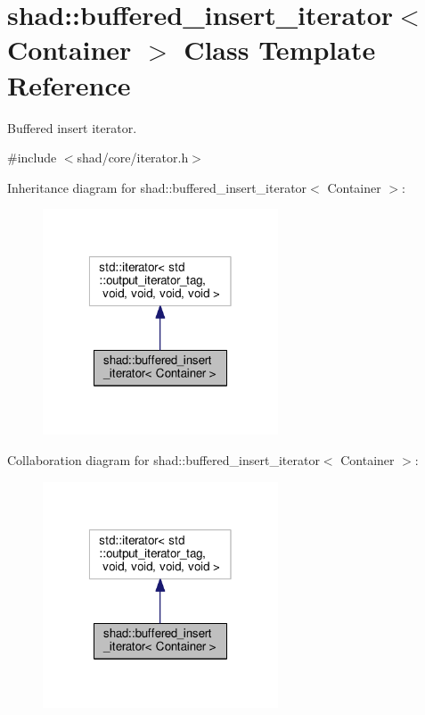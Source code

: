 \hypertarget{classshad_1_1buffered__insert__iterator}{\section{shad\-:\-:buffered\-\_\-insert\-\_\-iterator$<$ Container $>$ Class Template Reference}
\label{classshad_1_1buffered__insert__iterator}
}


Buffered insert iterator.  




{\ttfamily \#include $<$shad/core/iterator.\-h$>$}



Inheritance diagram for shad\-:\-:buffered\-\_\-insert\-\_\-iterator$<$ Container $>$\-:
\nopagebreak
\begin{figure}[H]
\begin{center}
\leavevmode
\includegraphics[width=198pt]{classshad_1_1buffered__insert__iterator__inherit__graph}
\end{center}
\end{figure}


Collaboration diagram for shad\-:\-:buffered\-\_\-insert\-\_\-iterator$<$ Container $>$\-:
\nopagebreak
\begin{figure}[H]
\begin{center}
\leavevmode
\includegraphics[width=198pt]{classshad_1_1buffered__insert__iterator__coll__graph}
\end{center}
\end{figure}
